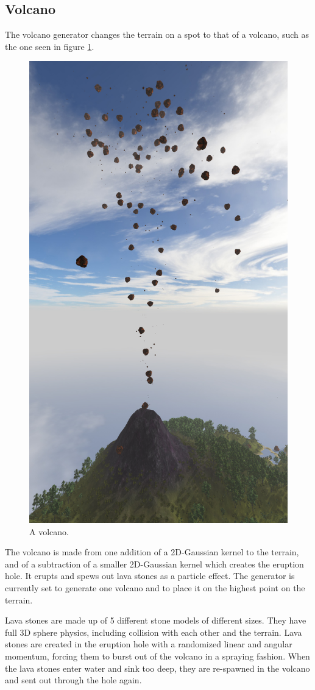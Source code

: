 \newpage
\subsection{Volcano}
The volcano generator changes the terrain on a spot to that of a volcano, such as the one seen in figure \ref{fig:volcano1}.
\begin{figure}[H]
  \centering
  \includegraphics[width=0.7\linewidth]{images/volcano.jpg}
  \caption{A volcano.}
  \label{fig:volcano1}
\end{figure}%
\newpage
The volcano is made from one addition of a 2D-Gaussian kernel to the terrain, and of a subtraction of a smaller 2D-Gaussian kernel which creates the eruption hole. It erupts and spews out lava stones as a particle effect. The generator is currently set to generate one volcano and to place it on the highest point on the terrain.

Lava stones are made up of 5 different stone models of different sizes. They have full 3D sphere physics, including collision with each other and the terrain. Lava stones are created in the eruption hole with a randomized linear and angular momentum, forcing them to burst out of the volcano in a spraying fashion. When the lava stones enter water and sink too deep, they are re-spawned in the volcano and sent out through the hole again.


